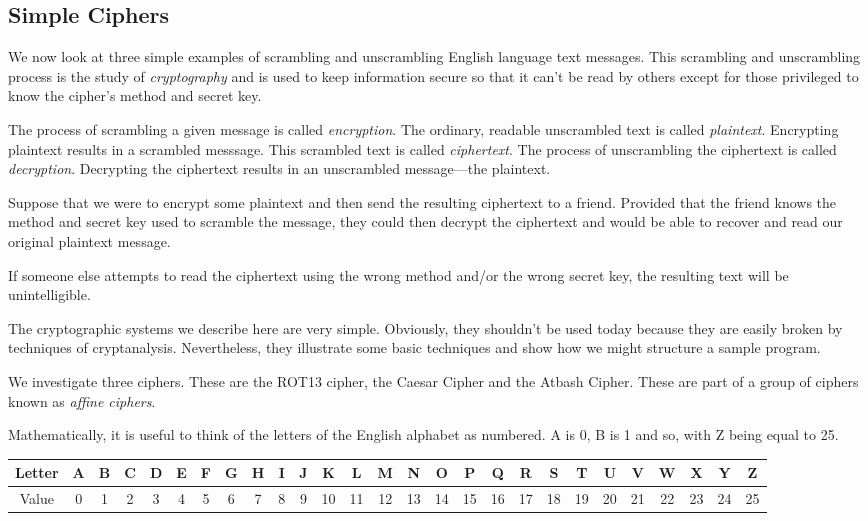 \subsection{Simple Ciphers}

We now look at three simple examples of scrambling and unscrambling English language text messages. This scrambling and unscrambling process is the study of {\it cryptography} and is used to keep information secure so that it can't be read by others except for those privileged to know the cipher's method and secret key.

The process of scrambling a given message is called {\it encryption}. The ordinary, readable unscrambled text is called {\it plaintext}. Encrypting plaintext results in a scrambled messsage. This scrambled text is called {\it ciphertext}. The process of unscrambling the ciphertext is called {\it decryption}. Decrypting the ciphertext results in an unscrambled message---the plaintext.

Suppose that we were to encrypt some plaintext and then send the resulting ciphertext to a friend. Provided that the friend knows the method and secret key used to scramble the message, they could then decrypt the ciphertext and would be able to recover and read our original plaintext message.

If someone else attempts to read the ciphertext using the wrong method and/or the wrong secret key, the resulting text will be unintelligible.

The cryptographic systems we describe here are very simple. Obviously, they shouldn't be used today because they are easily broken by techniques of cryptanalysis. Nevertheless, they illustrate some basic techniques and show how we might structure a sample program.

We investigate three ciphers. These are the ROT13 cipher, the Caesar Cipher and the Atbash Cipher. These are part of a group of ciphers known as {\it affine ciphers}.

Mathematically, it is useful to think of the letters of the English alphabet as numbered. A is 0, B is 1 and so, with Z being equal to 25.

\begin{center}
  \begin{tabular}{|c|c|c|c|c|c|c|c|c|c|c|c|c|c|c|c|c|c|c|c|c|c|c|c|c|c|c|}
  \hline
     Letter & A & B & C & D & E & F & G & H & I & J & K & L & M & N & O & P & Q & R & S & T & U & V & W & X & Y & Z \\ \hline
	Value & 0 & 1 & 2 & 3 & 4 & 5 & 6 & 7 & 8 & 9 & 10 & 11 & 12 & 13 & 14 & 15 & 16 & 17 & 18 & 19 & 20 & 21 & 22 & 23 & 24 & 25 \\ \hline
  \end{tabular}
\end{center}

